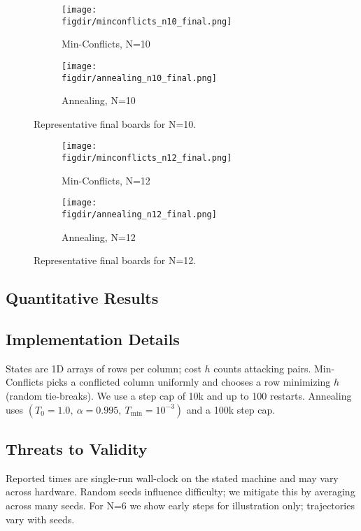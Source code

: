 \documentclass[11pt,a4paper]{article}
\newcommand{\figdir}{figures}
\begin{document}
\begin{figure}[H]\centering
  \begin{subfigure}{.48\linewidth}
    \texttt{[image: \\figdir/minconflicts\_n10\_final.png]}
    \caption{Min-Conflicts, N=10}
  \end{subfigure}\hfill
  \begin{subfigure}{.48\linewidth}
    \texttt{[image: \\figdir/annealing\_n10\_final.png]}
    \caption{Annealing, N=10}
  \end{subfigure}
  \caption{Representative final boards for N=10.}
\end{figure}

\begin{figure}[H]\centering
  \begin{subfigure}{.48\linewidth}
    \texttt{[image: \\figdir/minconflicts\_n12\_final.png]}
    \caption{Min-Conflicts, N=12}
  \end{subfigure}\hfill
  \begin{subfigure}{.48\linewidth}
    \texttt{[image: \\figdir/annealing\_n12\_final.png]}
    \caption{Annealing, N=12}
  \end{subfigure}
  \caption{Representative final boards for N=12.}
\end{figure}
\FloatBarrier

\subsection{Quantitative Results}


\subsection{Implementation Details}
States are 1D arrays of rows per column; cost $h$ counts attacking pairs. Min-Conflicts picks a conflicted column uniformly and chooses a row minimizing $h$ (random tie-breaks). We use a step cap of 10k and up to 100 restarts. Annealing uses $(T_0{=}1.0,\ \alpha{=}0.995,\ T_{\min}{=}10^{-3})$ and a 100k step cap.

\subsection{Threats to Validity}
Reported times are single-run wall-clock on the stated machine and may vary across hardware. Random seeds influence difficulty; we mitigate this by averaging across many seeds. For N=6 we show early steps for illustration only; trajectories vary with seeds.
\end{document}
